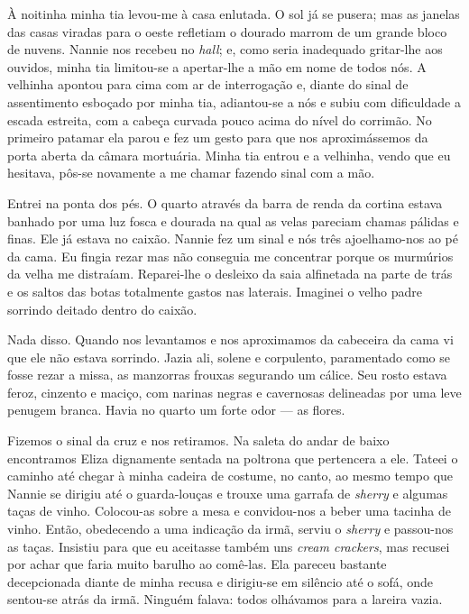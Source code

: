 À noitinha minha tia levou-me à casa enlutada.  O sol já se pusera; mas as
janelas das casas viradas para o oeste refletiam o dourado marrom de um grande
bloco de nuvens.  Nannie nos recebeu no \textit{hall}; e, como seria inadequado
gritar-lhe aos ouvidos, minha tia limitou-se a apertar-lhe a mão em nome de
todos nós.  A velhinha apontou para cima com ar de interrogação e, diante do
sinal de assentimento esboçado por minha tia, adiantou-se a nós e subiu com
dificuldade a escada estreita, com a cabeça curvada pouco acima do nível do
corrimão.  No primeiro patamar ela parou e fez um gesto para que nos
aproximássemos da porta aberta da câmara mortuária.  Minha tia entrou e a
velhinha, vendo que eu hesitava, pôs-se novamente a me chamar fazendo sinal com
a mão.

Entrei na ponta dos pés.  O quarto através da barra de renda da cortina estava
banhado por uma luz fosca e dourada na qual as velas pareciam chamas pálidas e
finas.  Ele já estava no caixão.  Nannie fez um sinal e nós três ajoelhamo-nos
ao pé da cama.  Eu fingia rezar mas não conseguia me concentrar porque os
murmúrios da velha me distraíam.  Reparei-lhe o desleixo da saia alfinetada na
parte de trás e os saltos das botas totalmente gastos nas laterais.  Imaginei o
velho padre sorrindo deitado dentro do caixão.

Nada disso.  Quando nos levantamos e nos aproximamos da cabeceira da cama vi
que ele não estava sorrindo.  Jazia ali, solene e corpulento, paramentado como
se fosse rezar a missa, as manzorras frouxas segurando um cálice.  Seu rosto
estava feroz, cinzento e maciço, com narinas negras e cavernosas delineadas por
uma leve penugem branca.  Havia no quarto um forte odor --- as flores.

Fizemos o sinal da cruz e nos retiramos.  Na saleta do andar de baixo
encontramos Eliza dignamente sentada na poltrona que pertencera a ele.  Tateei
o caminho até chegar à minha cadeira de costume, no canto, ao mesmo tempo que
Nannie se dirigiu até o guarda-louças e trouxe uma garrafa de \textit{sherry} e
algumas taças de vinho.  Colocou-as sobre a mesa e convidou-nos a beber uma
tacinha de vinho.  Então, obedecendo a uma indicação da irmã, serviu o
\textit{sherry} e passou-nos as taças.  Insistiu para que eu aceitasse também
uns \textit{cream crackers}, mas recusei por achar que faria muito barulho ao
comê-las.  Ela pareceu bastante decepcionada diante de minha recusa e
dirigiu-se em silêncio até o sofá, onde sentou-se atrás da irmã.  Ninguém
falava: todos olhávamos para a lareira vazia.

